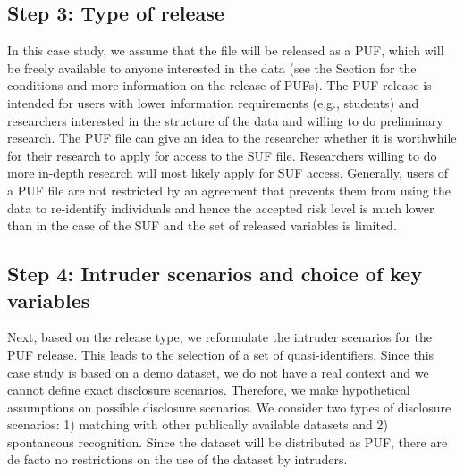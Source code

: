 \documentclass[letterpaper,10pt,english]{sphinxmanual}
\begin{document}
\subsection{Step 3: Type of release}
\label{\detokenize{casestudies:id8}}
In this case study, we assume that the file will be released as a PUF,
which will be freely available to anyone interested in the data (see
the Section 
for the conditions and more information on the release of
PUFs). The PUF release is intended for users with lower information
requirements (e.g., students) and researchers interested in the
structure of the data and willing to do preliminary research. The PUF
file can give an idea to the researcher whether it is worthwhile for
their research to apply for access to the SUF file. Researchers willing
to do more in-depth research will most likely apply for SUF access.
Generally, users of a PUF file are not restricted by an agreement that
prevents them from using the data to re-identify individuals and hence
the accepted risk level is much lower than in the case of the SUF and
the set of released variables is limited.


\subsection{Step 4: Intruder scenarios and choice of key variables}
\label{\detokenize{casestudies:id9}}
Next, based on the release type, we reformulate the intruder scenarios
for the PUF release. This leads to the selection of a set of
quasi-identifiers. Since this case study is based on a demo dataset, we
do not have a real context and we cannot define exact disclosure
scenarios. Therefore, we make hypothetical assumptions on possible
disclosure scenarios. We consider two types of disclosure scenarios: 1)
matching with other publically available datasets and 2) spontaneous
recognition. Since the dataset will be distributed as PUF, there are de
facto no restrictions on the use of the dataset by intruders.
\end{document}
